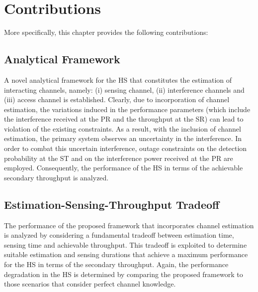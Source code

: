\section{Contributions}
More specifically, this chapter provides the following contributions:

\subsection{Analytical Framework}
A novel analytical framework for the HS that constitutes the estimation of interacting channels, namely: (i) sensing channel, (ii) interference channels and (iii) access channel is established. Clearly, due to incorporation of channel estimation, the variations induced in the performance parameters (which include the interference received at the PR and the throughput at the SR) can lead to violation of the existing constraints. As a result, with the inclusion of channel estimation, the primary system observes an uncertainty in the interference. 
In order to combat this uncertain interference, outage constraints on the detection probability at the ST and on the interference power received at the PR are employed. Consequently, the performance of the HS in terms of the achievable secondary throughput is analyzed.
\subsection{Estimation-Sensing-Throughput Tradeoff}
The performance of the proposed framework that incorporates channel estimation is analyzed by considering a fundamental tradeoff between estimation time, sensing time and achievable throughput. This tradeoff is exploited to determine suitable estimation and sensing durations that achieve a maximum performance for the HS in terms of the secondary throughput. %
Again, the performance degradation in the HS is determined by comparing the proposed framework to those scenarios that consider perfect channel knowledge.  

